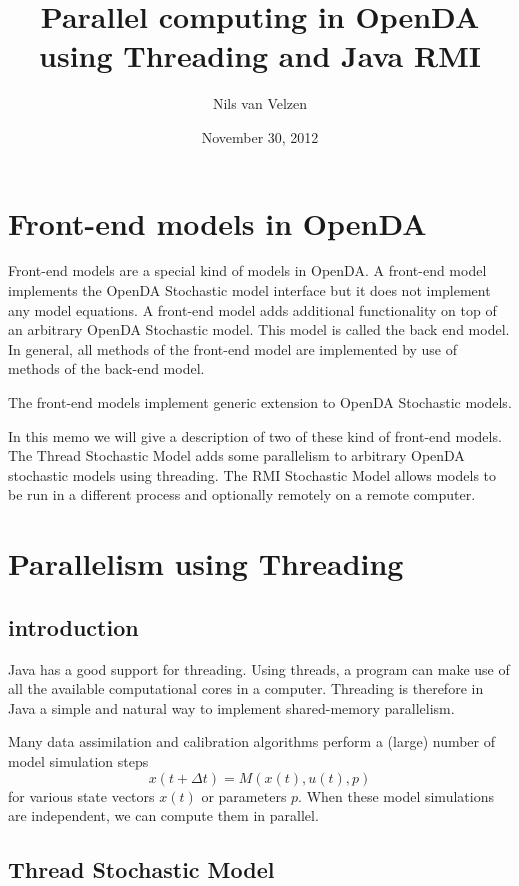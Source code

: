 \documentclass[12pt]{article}
\title{Parallel computing in OpenDA using Threading and Java RMI}
\author{Nils van Velzen}
\date{November 30, 2012}
\begin{document}
\maketitle

\section{Front-end models in OpenDA}
Front-end models are a special kind of models in OpenDA. A front-end model implements the  OpenDA Stochastic model interface but it does not implement any model equations. A front-end model adds additional functionality on top of an arbitrary OpenDA Stochastic model. This model is called the back end model. In general, all methods of the front-end model are implemented by use of methods of the back-end model.

The front-end models implement generic extension to OpenDA Stochastic models.

In this memo we will give a description of two of these kind of front-end models. The Thread Stochastic Model adds some parallelism to arbitrary OpenDA stochastic models using threading. The RMI Stochastic Model allows models to be run in a different process and optionally remotely on a remote computer.

\section{Parallelism using Threading}
\subsection{introduction}
Java has a good support for threading. Using threads, a program can make use of all the available computational cores in a computer. Threading is therefore in Java a simple and natural way to implement shared-memory parallelism. 

Many data assimilation and calibration algorithms perform a (large) number of model simulation steps
\begin{equation}
x\left(t+\Delta t \right)= M\left(x\left(t \right),u\left(t \right), p\right)
\end{equation}
for various state vectors $x\left(t \right)$ or parameters $p$. When these model simulations are independent, we can compute them in parallel.  

\subsection{Thread Stochastic Model}
\end{document}
